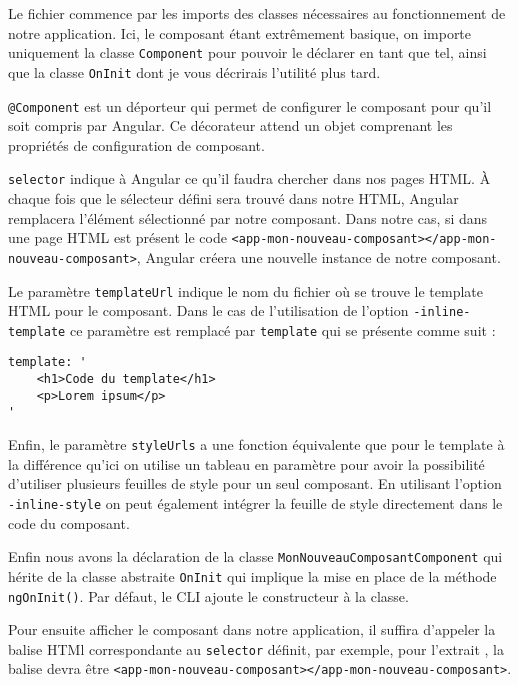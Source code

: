 Le fichier commence par les imports des classes nécessaires au fonctionnement de notre application. Ici, le composant étant extrêmement basique, on importe uniquement la classe \texttt{Component} pour pouvoir le déclarer en tant que tel, ainsi que la classe \texttt{OnInit} dont je vous décrirais l'utilité plus tard.

\texttt{@Component} est un déporteur qui permet de configurer le composant pour qu'il soit compris par Angular. Ce décorateur attend un objet comprenant les propriétés de configuration de composant. 

\texttt{selector} indique à Angular ce qu’il faudra chercher dans nos pages HTML. À chaque fois que le sélecteur défini sera trouvé dans notre HTML, Angular remplacera l’élément sélectionné par notre composant. Dans notre cas, si dans une page HTML est présent le code \texttt{<app-mon-nouveau-composant></app-mon-nouveau-composant>}, Angular créera une nouvelle instance de notre composant.

Le paramètre \texttt{templateUrl} indique le nom du fichier où se trouve le template HTML pour le composant. Dans le cas de l'utilisation de l'option \texttt{-inline-template} ce paramètre est remplacé par \texttt{template} qui se présente comme suit :

\begin{lstlisting}[style=htmlcssjs, caption={inline-template}]
template: '
	<h1>Code du template</h1>
	<p>Lorem ipsum</p>
'
\end{lstlisting}

Enfin, le paramètre \texttt{styleUrls} a une fonction équivalente que pour le template à la différence qu'ici on utilise un tableau en paramètre pour avoir la possibilité d'utiliser plusieurs feuilles de style pour un seul composant. En utilisant l'option \texttt{-inline-style} on peut également intégrer la feuille de style directement dans le code du composant.

Enfin nous avons la déclaration de la classe \texttt{MonNouveauComposantComponent} qui hérite de la classe abstraite \texttt{OnInit} qui implique la mise en place de la méthode \texttt{ngOnInit()}. Par défaut, le CLI ajoute le constructeur à la classe.

Pour ensuite afficher le composant dans notre application, il suffira d'appeler la balise HTMl correspondante au \texttt{selector} définit, par exemple, pour l'extrait \label{composant}, la balise devra être \texttt{<app-mon-nouveau-composant></app-mon-nouveau-composant>}.

